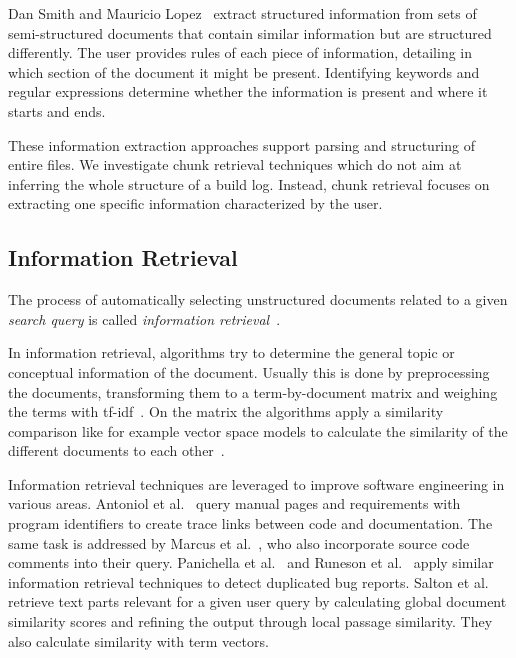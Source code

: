 \documentclass[\myrootdir/main.tex]{subfiles}
\begin{document}
Dan Smith and Mauricio Lopez~\cite{smith1997information} extract structured information from sets of semi-structured documents that contain similar information but are structured differently.
The user provides rules of each piece of information, detailing in which section of the document it might be present.
Identifying keywords and regular expressions determine whether the information is present and where it starts and ends.

These information extraction approaches support parsing and structuring of entire files.
We investigate chunk retrieval techniques which do not aim at inferring the whole structure of a build log.
Instead, chunk retrieval focuses on extracting one specific information characterized by the user.

\subsection{Information Retrieval}%
The process of automatically selecting unstructured documents related to a given \emph{search query} is called \emph{information retrieval}~\cite{schutze2008introduction}.

In information retrieval, algorithms try to determine the general topic or conceptual information of the document.
Usually this is done by preprocessing the documents, transforming them to a term-by-document matrix and weighing the terms with tf-idf~\cite{lee1997document}.
On the matrix the algorithms apply a similarity comparison like for example vector space models to calculate the similarity of the different documents to each other~\cite{panichella2016parameterizing}.

Information retrieval techniques are leveraged to improve software engineering in various areas.
Antoniol et al.~\cite{antoniol2002recovering} query manual pages and requirements with program identifiers to create trace links between code and documentation.
The same task is addressed by Marcus et al.~\cite{marcus2005recovery}, who also incorporate source code comments into their query.
Panichella et al.~\cite{panichella2016parameterizing} and Runeson et al.~\cite{runeson2007detection} apply similar information retrieval techniques to detect duplicated bug reports.
Salton et al.~\cite{salton1993approaches} retrieve text parts relevant for a given user query by calculating global document similarity scores and refining the output through local passage similarity.
They also calculate similarity with term vectors.
\end{document}

